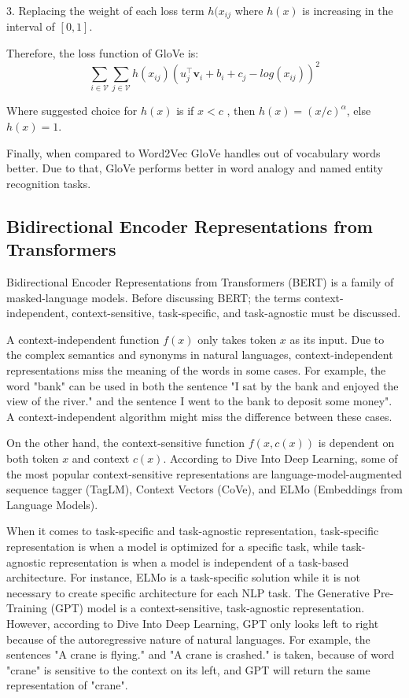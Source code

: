 \documentclass[man]{apa7}
\begin{document}
3. Replacing the weight of each loss term $h(x_{ij}$ where $h(x)$ is increasing in the interval of $[0,1]$.
 
Therefore, the loss function of GloVe is:
\begin{equation}
\sum_{i \in \mathcal{V}} \sum_{j \in \mathcal{V}} h(x_{ij})(u_j^\top \mathbf{v}_i + b_i +c_j -log(x_{ij}))^2
\end{equation}


Where suggested choice for $h(x)$ is if $x < c$ , then $h(x) = (x/c)^\alpha$, else $h(x) = 1$. 

Finally, when compared to Word2Vec GloVe handles out of vocabulary words better. Due to that, GloVe performs better in word analogy and named entity recognition tasks.

\subsection{Bidirectional Encoder Representations from Transformers}
Bidirectional Encoder Representations from Transformers (BERT) is a family of masked-language models. Before discussing BERT; the terms context-independent, context-sensitive, task-specific, and task-agnostic must be discussed.

A context-independent function $f(x)$ only takes token $x$ as its input. Due to the complex semantics and synonyms in natural languages, context-independent representations miss the meaning of the words in some cases. For example, the word "bank" can be used in both the sentence "I sat by the bank and enjoyed the view of the river." and the sentence I went to the bank to deposit some money". A context-independent algorithm might miss the difference between these cases.

On the other hand, the context-sensitive function $f(x,c(x))$ is dependent on both token $x$ and context $c(x)$. According to Dive Into Deep Learning, some of the most popular context-sensitive representations are language-model-augmented sequence tagger (TagLM), Context Vectors (CoVe), and ELMo (Embeddings from Language Models).

When it comes to task-specific and task-agnostic representation, task-specific representation is when a model is optimized for a specific task, while task-agnostic representation is when a model is independent of a task-based architecture. For instance, ELMo is a task-specific solution while it is not necessary to create specific architecture for each NLP task. The Generative Pre-Training  (GPT) model is a context-sensitive, task-agnostic representation. However, according to Dive Into Deep Learning, GPT only looks left to right because of the autoregressive nature of natural languages. For example, the sentences "A crane is flying." and "A crane is crashed." is taken, because of word "crane" is sensitive to the context on its left, and GPT will return the same representation of "crane".
\end{document}
